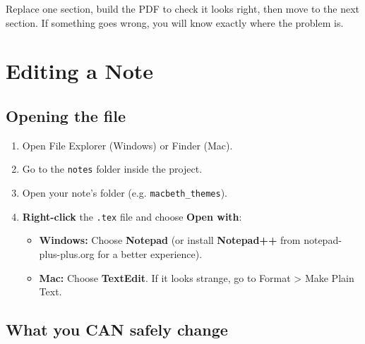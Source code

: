 \documentclass[a4paper,11pt]{article}
\begin{document}
\begin{tipbox}
Replace one section, build the PDF to check it looks right, then move to the next section. If something goes wrong, you will know exactly where the problem is.
\end{tipbox}

\section{Editing a Note}

\subsection{Opening the file}

\begin{enumerate}[itemsep=6pt]
  \item Open File Explorer (Windows) or Finder (Mac).
  \item Go to the \texttt{notes} folder inside the project.
  \item Open your note's folder (e.g. \texttt{macbeth\_themes}).
  \item \textbf{Right-click} the \texttt{.tex} file and choose \textbf{Open with}:
    \begin{itemize}
      \item \textbf{Windows:} Choose \textbf{Notepad} (or install \textbf{Notepad++} from notepad-plus-plus.org for a better experience).
      \item \textbf{Mac:} Choose \textbf{TextEdit}. If it looks strange, go to Format > Make Plain Text.
    \end{itemize}
\end{enumerate}

\subsection{What you CAN safely change}
\end{document}
